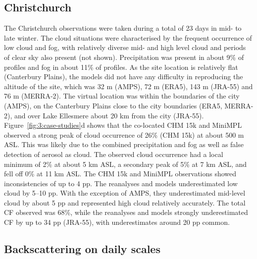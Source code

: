 \subsection{Christchurch}

The Christchurch observations were taken during a total of 23 days in mid-
to late winter. The cloud situations were characterised by the frequent occurrence of low cloud
and fog, with relatively diverse mid- and high level cloud and periods of clear
sky also present (not shown). Precipitation was present in about 9\% of profiles and fog
in about 11\% of profiles. As the site location is relatively flat
(Canterbury Plains), the models did not have any difficulty in reproducing the
altitude of the site, which was 32 m (AMPS), 72 m (ERA5), 143 m (JRA-55) and
76 m (MERRA-2). The virtual location was within the boundaries of the city
(AMPS), on the Canterbury Plains close to the city boundaries (ERA5, MERRA-2),
and over Lake Ellesmere about 20 km from the city (JRA-55).
Figure~\ref{fig:3:case-studies}d shows that the co-located CHM 15k and MiniMPL
observed a strong peak of cloud occurrence of 26\% (CHM 15k) at about 500 m ASL. This was
likely due to the combined precipitation and fog as well as false detection
of aerosol as cloud. The observed cloud occurrence
had a local minimum of 2\% at about 5 km ASL, a secondary peak of
5\% at 7 km ASL, and fell off 0\% at 11 km ASL.
The CHM 15k and MiniMPL observations showed inconsistencies
of up to 4 pp. The reanalyses and
models underestimated low cloud by 5--10 pp. With the
exception of AMPS, they underestimated mid-level cloud by about 5 pp and
represented high cloud relatively accurately.
The total CF observed was 68\%, while the reanalyses and models strongly
underestimated CF by up to 34 pp (JRA-55), with
underestimates around 20 pp common.

\subsection{Backscattering on daily scales}
\label{sec:3:backscattering-daily}

